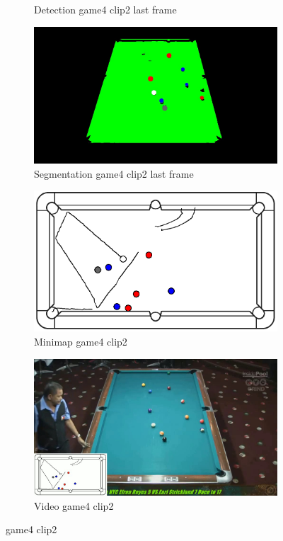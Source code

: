 \begin{figure}[H]
\begin{subfigure}[b]{0.48\textwidth}
		\caption{Detection game4 clip2 last frame}
		\label{fig: game4_clip2_last_frame_detected}
	\end{subfigure}
	\begin{subfigure}[b]{0.48\textwidth}
		\centering
		\includegraphics[width=\textwidth]{images/Segmentation/game4_clip2_segmented_balls_last_frame.jpg}
		\caption{Segmentation game4 clip2 last frame}
		\label{fig: game4_clip2_last_frame_segmented}
	\end{subfigure}
	\begin{subfigure}[b]{0.48\textwidth}
		\centering
		\includegraphics[width=\textwidth]{images/AllMinimap/game4_clip2_minimap.png}
		\caption{Minimap game4 clip2}
		\label{fig: game4_clip2_minimap}
	\end{subfigure}
	\begin{subfigure}[b]{0.48\textwidth}
		\centering
		\includegraphics[width=\textwidth]{images/Video/game4_clip2_video.jpg}
		\caption{Video game4 clip2}
		\label{fig: game4_clip2_video}
	\end{subfigure}

	\caption{game4 clip2}
\end{figure}

